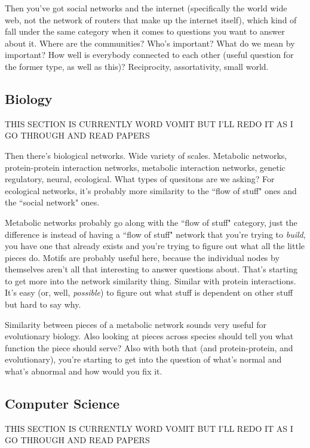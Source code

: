 \documentclass[12pt]{thesis}
\theoremstyle{plain}
\theoremstyle{definition}
\theoremstyle{remark}
\begin{document}
Then you've got social networks and the internet (specifically the world wide web, not the network of routers that make up the internet itself), which kind of fall under the same category when it comes to questions you want to answer about it. Where are the communities? Who's important? What do we mean by important? How well is everybody connected to each other (useful question for the former type, as well as this)? Reciprocity, assortativity, small world.


\subsection{Biology}


THIS SECTION IS CURRENTLY WORD VOMIT BUT I'LL REDO IT AS I GO THROUGH AND READ PAPERS

Then there's biological networks. Wide variety of scales. Metabolic networks, protein-protein interaction networks, metabolic interaction networks, genetic regulatory, neural, ecological. What types of quesitons are we asking? For ecological networks, it's probably more similarity to the ``flow of stuff" ones and the ``social network" ones. 

Metabolic networks probably go along with the ``flow of stuff" category, just the difference is instead of having a ``flow of stuff" network that you're trying to \textit{build}, you have one that already exists and you're trying to figure out what all the little pieces do. Motifs are probably useful here, because the individual nodes by themselves aren't all that interesting to answer questions about. That's starting to get more into the network similarity thing. Similar with protein interactions. It's easy (or, well, \textit{possible}) to figure out what stuff is dependent on other stuff but hard to say why. 

Similarity between pieces of a metabolic network sounds very useful for evolutionary biology. Also looking at pieces across species should tell you what function the piece should serve? Also with both that (and protein-protein, and evolutionary), you're starting to get into the question of what's normal and what's abnormal and how would you fix it.


\subsection{Computer Science}


THIS SECTION IS CURRENTLY WORD VOMIT BUT I'LL REDO IT AS I GO THROUGH AND READ PAPERS
\end{document}
